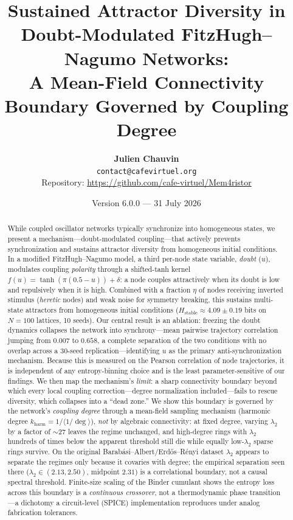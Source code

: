 ﻿\documentclass[11pt]{article}
\title{Sustained Attractor Diversity in Doubt-Modulated FitzHugh--Nagumo Networks:\\
A Mean-Field Connectivity Boundary Governed by Coupling Degree}
\author{
    \textbf{Julien Chauvin} \\
    \small{\texttt{contact@cafevirtuel.org}} \\
    \small{Repository: \url{https://github.com/cafe-virtuel/Mem4ristor}}
}
\date{Version 6.0.0 --- 31 July 2026}
\begin{document}
\maketitle

\begin{abstract}
While coupled oscillator networks typically synchronize into homogeneous states, we present a mechanism---doubt-modulated coupling---that actively prevents synchronization and sustains attractor diversity from homogeneous initial conditions. In a modified FitzHugh--Nagumo model, a third per-node state variable, \emph{doubt} ($u$), modulates coupling \emph{polarity} through a shifted-tanh kernel $f(u) = \tanh(\pi(0.5-u)) + \delta$: a node couples attractively when its doubt is low and repulsively when it is high. Combined with a fraction $\eta$ of nodes receiving inverted stimulus (\emph{heretic} nodes) and weak noise for symmetry breaking, this sustains multi-state attractors from homogeneous initial conditions ($H_{\text{stable}} \approx 4.09 \pm 0.19$ bits on $N = 100$ lattices, 10 seeds). Our central result is an ablation: freezing the doubt dynamics collapses the network into synchrony---mean pairwise trajectory correlation jumping from $0.007$ to $0.658$, a complete separation of the two conditions with no overlap across a 30-seed replication---identifying $u$ as the primary anti-synchronization mechanism. Because this is measured on the Pearson correlation of node trajectories, it is independent of any entropy-binning choice and is the least parameter-sensitive of our findings. We then map the mechanism's \emph{limit}: a sharp connectivity boundary beyond which every local coupling correction---degree normalization included---fails to rescue diversity, which collapses into a ``dead zone.'' We show this boundary is governed by the network's \emph{coupling degree} through a mean-field sampling mechanism (harmonic degree $k_{\mathrm{harm}} = 1/\langle 1/\deg\rangle$), \emph{not} by algebraic connectivity: at fixed degree, varying $\lambda_2$ by a factor of ${\sim}27$ leaves the regime unchanged, and high-degree rings with $\lambda_2$ hundreds of times below the apparent threshold still die while equally low-$\lambda_2$ sparse rings survive. On the original Barab\'asi--Albert/Erd\H{o}s--R\'enyi dataset $\lambda_2$ appears to separate the regimes only because it covaries with degree; the empirical separation seen there ($\lambda_2 \in (2.13, 2.50)$, midpoint $2.31$) is a correlational boundary, not a causal spectral threshold. Finite-size scaling of the Binder cumulant shows the entropy loss across this boundary is a \emph{continuous crossover}, not a thermodynamic phase transition---a dichotomy a circuit-level (SPICE) implementation reproduces under analog fabrication tolerances.
\end{abstract}
\end{document}
